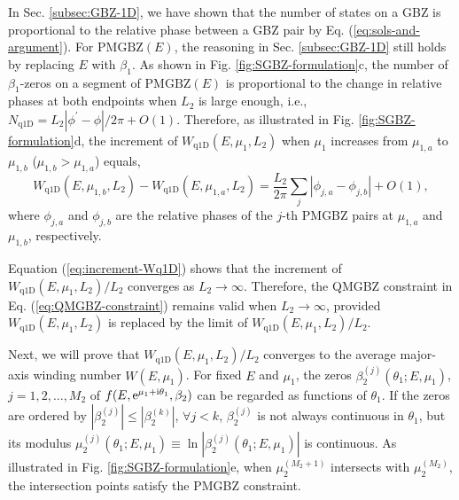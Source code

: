 \documentclass[pdflatex,sn-nature, iicol]{sn-jnl}%
\theoremstyle{thmstyleone}%
\theoremstyle{thmstyletwo}%
\theoremstyle{thmstylethree}%
\begin{document}
In Sec. \ref{subsec:GBZ-1D}, we have shown that the number of states
on a GBZ is proportional to the relative phase between a GBZ pair
by Eq. (\ref{eq:sols-and-argument}). For $\text{PMGBZ}(E)$, the
reasoning in Sec. \ref{subsec:GBZ-1D} still holds by replacing $E$
with $\beta_{1}$. As shown in Fig. \ref{fig:SGBZ-formulation}c,
the number of $\beta_{1}$-zeros on a segment of $\text{PMGBZ}(E)$
is proportional to the change in relative phases at both endpoints
when $L_{2}$ is large enough, i.e., $N_{\text{q1D}}=L_{2}|\phi^{\prime}-\phi|/2\pi+O(1)$.
Therefore, as illustrated in Fig. \ref{fig:SGBZ-formulation}d, the
increment of $W_{\text{q1D}}(E,\mu_{1},L_{2})$ when $\mu_{1}$ increases
from $\mu_{1,a}$ to $\mu_{1,b}$ ($\mu_{1,b}>\mu_{1,a}$) equals,
\begin{equation}
W_{\text{q1D}}\left(E,\mu_{1,b},L_{2}\right)-W_{\text{q1D}}\left(E,\mu_{1,a},L_{2}\right)=\frac{L_{2}}{2\pi}\sum_{j}\left|\phi_{j,a}-\phi_{j,b}\right|+O(1),\label{eq:increment-Wq1D}
\end{equation}
where $\phi_{j,a}$ and $\phi_{j,b}$ are the relative phases of the
$j$-th PMGBZ pairs at $\mu_{1,a}$ and $\mu_{1,b}$, respectively.

Equation (\ref{eq:increment-Wq1D}) shows that the increment of $W_{\text{q1D}}(E,\mu_{1},L_{2})/L_{2}$
converges as $L_{2}\rightarrow\infty$. Therefore, the QMGBZ constraint
in Eq. (\ref{eq:QMGBZ-constraint}) remains valid when $L_{2}\rightarrow\infty$,
provided $W_{\text{q1D}}(E,\mu_{1},L_{2})$ is replaced by the limit
of $W_{\text{q1D}}(E,\mu_{1},L_{2})/L_{2}$.

Next, we will prove that $W_{\text{q1D}}(E,\mu_{1},L_{2})/L_{2}$ converges to the average major-axis winding number $W(E,\mu_1)$. 
For fixed $E$ and $\mu_{1}$, the zeros $\beta_{2}^{(j)}(\theta_{1};E,\mu_{1})$,
$j=1,2,\dots,M_{2}$ of $f(E,\mathrm{e}^{\mu_{1}+\mathrm{i}\theta_{1}},\beta_{2})$
can be regarded as functions of $\theta_{1}$. If the zeros are ordered
by $|\beta_{2}^{(j)}|\leq|\beta_{2}^{(k)}|$, $\forall j<k$, $\beta_{2}^{(j)}$
is not always continuous in $\theta_{1}$, but its modulus $\mu_{2}^{(j)}(\theta_{1};E,\mu_{1})\equiv\ln|\beta_{2}^{(j)}(\theta_{1};E,\mu_{1})|$
is continuous. As illustrated in Fig. \ref{fig:SGBZ-formulation}e,
when $\mu_{2}^{(M_{2}+1)}$ intersects with $\mu_{2}^{(M_{2})}$,
the intersection points satisfy the PMGBZ constraint.
\end{document}
